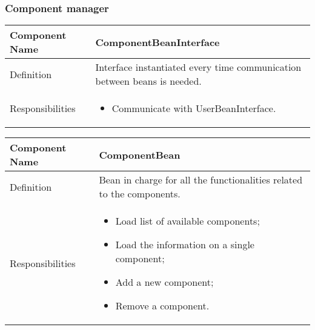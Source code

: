 \documentclass[a4paper,12pt]{book}
\begin{document}
\subsubsection{Component manager}
\begin{center}
  \begin{tabular}{ | p{3.3cm} | p{11.7cm} | }
    \hline
    Component Name & \textbf{ComponentBeanInterface} \\ \hline
    Definition & Interface instantiated every time communication between beans is needed. \\ \hline
    Responsibilities & \parbox{0.65\textwidth}{
      \begin{itemize}[noitemsep,leftmargin=*]
        \item Communicate with UserBeanInterface.
      \end{itemize}} \\ \hline
    \end{tabular}
  \end{center}
  \begin{center}
    \begin{tabular}{ | p{3.3cm} | p{11.7cm} | }
      \hline
      Component Name & \textbf{ComponentBean} \\ \hline
      Definition & Bean in charge for all the functionalities related to the components. \\ \hline
      Responsibilities & \parbox{0.65\textwidth}{
        \begin{itemize}[noitemsep,leftmargin=*]
          \item Load list of available components;
          \item Load the information on a single component;
          \item Add a new component;
          \item Remove a component.
        \end{itemize}} \\ \hline
      \end{tabular}
    \end{center}
\end{document}
